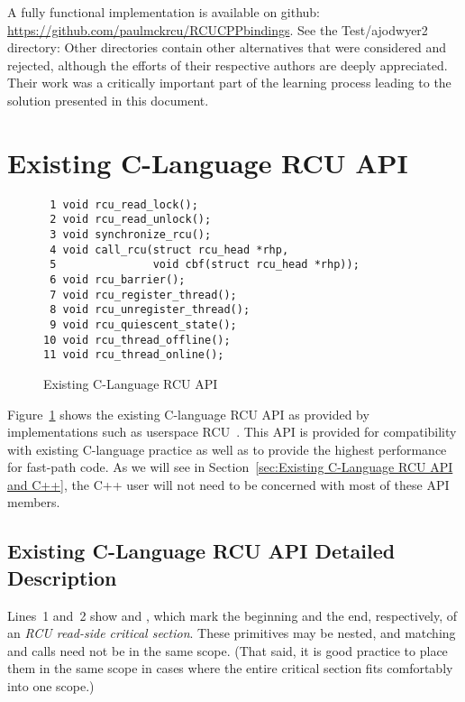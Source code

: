 \documentclass[letterpaper,10pt]{article}
\begin{document}
A fully functional implementation is available on github:
\url{https://github.com/paulmckrcu/RCUCPPbindings}.
See the Test/ajodwyer2 directory: Other directories contain other
alternatives that were considered and rejected, although the efforts
of their respective authors are deeply appreciated.
Their work was a critically important part of the learning process
leading to the solution presented in this document.

\section{Existing C-Language RCU API}
\label{sec:Existing C-Language RCU API}

\begin{figure}[tbp]
{ \scriptsize
\begin{verbatim}
 1 void rcu_read_lock();
 2 void rcu_read_unlock();
 3 void synchronize_rcu();
 4 void call_rcu(struct rcu_head *rhp,
 5               void cbf(struct rcu_head *rhp));
 6 void rcu_barrier();
 7 void rcu_register_thread();
 8 void rcu_unregister_thread();
 9 void rcu_quiescent_state();
10 void rcu_thread_offline();
11 void rcu_thread_online();
\end{verbatim}
}
\caption{Existing C-Language RCU API}
\label{fig:Existing C-Language RCU API}
\end{figure}

Figure~\ref{fig:Existing C-Language RCU API}
shows the existing C-language RCU API as provided by implementations such as
userspace RCU~\cite{MathieuDesnoyers2009URCU,PaulMcKenney2013LWNURCU}.
This API is provided for compatibility with existing C-language practice as
well as to provide the highest performance for fast-path code.
As we will see in
Section~\ref{sec:Existing C-Language RCU API and C++},
the C++ user will not need to be concerned with most
of these API members.

\subsection{Existing C-Language RCU API Detailed Description}
\label{sec:Existing C-Language RCU API Detailed Description}

Lines~1 and~2 show  and ,
which mark the beginning and the end, respectively, of an \emph{RCU read-side
critical section}.
These primitives may be nested, and matching 
and  calls need not be in the same scope.
(That said, it is good practice to place them in the same scope
in cases where the entire critical section fits comfortably into
one scope.)
\end{document}
